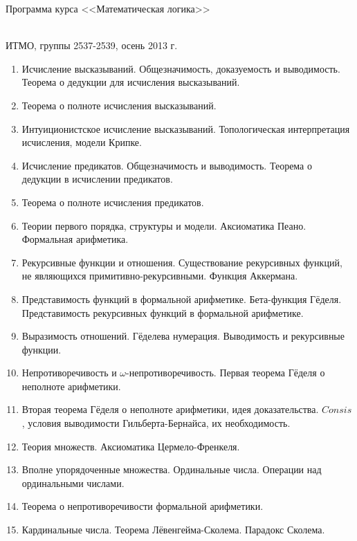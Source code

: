 \documentclass[12pt,a4paper,oneside]{book}
\begin{document}
\begin{center}
\begin{Large}Программа курса <<Математическая логика>>\end{Large}\\
ИТМО, группы 2537-2539, осень 2013 г.
\end{center}

\begin{enumerate}
\item Исчисление высказываний. Общезначимость, доказуемость и выводимость. Теорема о дедукции для исчисления высказываний.
\item Теорема о полноте исчисления высказываний.
\item Интуиционистское исчисление высказываний. Топологическая интерпретация исчисления, модели Крипке.
\item Исчисление предикатов. Общезначимость и выводимость. Теорема о дедукции в исчислении предикатов.
\item Теорема о полноте исчисления предикатов.
\item Теории первого порядка, структуры и модели. Аксиоматика Пеано. Формальная арифметика. 
\item Рекурсивные функции и отношения. Существование рекурсивных функций,
не являющихся примитивно-рекурсивными. Функция Аккермана.
\item Представимость функций в формальной арифметике. Бета-функция Гёделя. 
Представимость рекурсивных функций в формальной арифметике.
\item Выразимость отношений. Гёделева нумерация. Выводимость и рекурсивные функции.
\item Непротиворечивость и $\omega$-непротиворечивость. Первая теорема Гёделя о неполноте арифметики.
\item Вторая теорема Гёделя о неполноте арифметики, идея доказательства. 
$Consis$, условия выводимости Гильберта-Бернайса, их необходимость.
\item Теория множеств. Аксиоматика Цермело-Френкеля.
\item Вполне упорядоченные множества. Ординальные числа. Операции над ординальными числами. 
\item Теорема о непротиворечивости формальной арифметики.
\item Кардинальные числа. Теорема Лёвенгейма-Сколема. Парадокс Сколема.
\end{enumerate}
\end{document}
